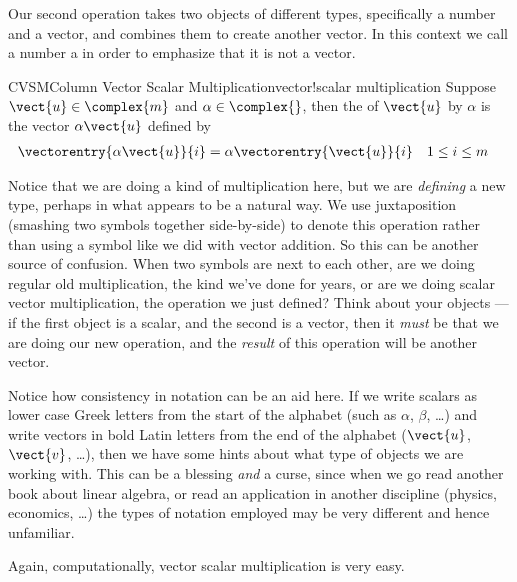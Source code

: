 %
Our second operation takes two objects of different types, specifically a number and a vector, and combines them to create another vector.  In this context we call a number a  in order to emphasize that it is not a vector.
%
\begin{definition}{CVSM}{Column Vector Scalar Multiplication}{vector!scalar multiplication}
Suppose $\vect{u}\in\complex{m}$ and $\alpha\in\complex{\null}$, then the  of $\vect{u}$ by $\alpha$ is the vector $\alpha\vect{u}$ defined by
%
\begin{align*}
\vectorentry{\alpha\vect{u}}{i}
&=\alpha\vectorentry{\vect{u}}{i}
&&1\leq i\leq m
\end{align*}
%
\end{definition}
%
Notice that we are doing a kind of multiplication here, but we are {\em defining} a new type, perhaps in what appears to be a natural way.  We use juxtaposition (smashing two symbols together side-by-side) to denote this operation rather than using a symbol like we did with vector addition.  So this can be another source of confusion.  When two symbols are next to each other, are we doing regular old multiplication, the kind we've done for years, or are we doing scalar vector multiplication, the operation we just defined?  Think about your objects --- if the first object is a scalar, and the second is a vector, then it {\em must} be that we are doing our new operation, and the {\em result} of this operation will be another vector.\par
%
Notice how consistency in notation can be an aid here.  If we write scalars as lower case Greek letters from the start of the alphabet (such as $\alpha$, $\beta$, \dots) and write vectors in bold Latin letters from the end of the alphabet ($\vect{u}$, $\vect{v}$, \dots), then we have some hints about what type of objects we are working with.  This can be a blessing {\em and} a curse, since when we go read another book about linear algebra, or read an application in another discipline (physics, economics, \dots) the types of notation employed may be very different and hence unfamiliar.\par
%
Again, computationally, vector scalar multiplication is very easy.
%
